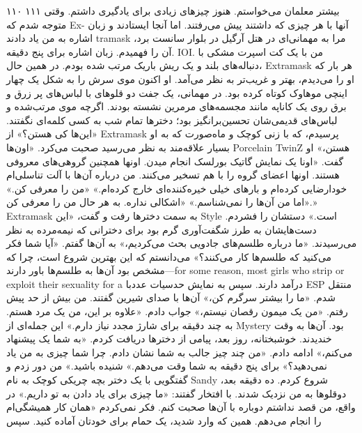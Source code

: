۱۱۰ ۱۱۱  
بیشتر معلمان می‌خواستم. هنوز چیزهای زیادی برای یادگیری داشتم. وقتی متوجه شدم که Ex- آنها با هر چیزی که داشتند پیش می‌رفتند. اما آنجا ایستادند و زبان اشاره به من یاد دادند  
tramask مرا به مهمانی‌ای در هتل آرگیل در بلوار سانست برد، آن را فهمیدم. زبان اشاره برای پنج دقیقه. IOI.  
من با یک کت اسپرت مشکی با دنباله‌های بلند و یک ریش باریک مرتب شده بودم. در همین حال، Extramask هر بار که او را می‌دیدم، بهتر و غریب‌تر به نظر می‌آمد. او اکنون موی سرش را به شکل یک چهار اینچی موهاوک کوتاه کرده بود.  
در مهمانی، یک جفت دو قلوهای با لباس‌های پر زرق و برق روی یک کاناپه مانند مجسمه‌های مرمرین نشسته بودند. اگرچه موی مرتب‌شده و لباس‌های قدیمی‌شان تحسین‌برانگیز بود؛ دخترها تمام شب به کسی کلمه‌ای نگفتند.  
«این‌ها کی هستن؟» از Extramask پرسیدم، که با زنی کوچک و ماه‌صورت که به او بسیار علاقه‌مند به نظر می‌رسید صحبت می‌کرد.  
«اون‌ها Porcelain TwinZ هستن،» او گفت. «اونا یک نمایش گاتیک بورلسک انجام میدن. اونها همچنین گروهی‌های معروفی هستند. اونها اعضای گروه را با هم تسخیر می‌کنند. من درباره آن‌ها با آلت تناسلی‌ام خودارضایی کرده‌ام و بارهای خیلی خیره‌کننده‌ای خارج کرده‌ام.»  
«من را معرفی کن.»  
«اما من آن‌ها را نمی‌شناسم.»  
«اشکالی نداره. به هر حال من را معرفی کن.»  
Extramask به سمت دخترها رفت و گفت، «این Style است.»  
دستشان را فشردم. دست‌هایشان به طرز شگفت‌آوری گرم بود برای دخترانی که نیمه‌مرده به نظر می‌رسیدند. «ما درباره طلسم‌های جادویی بحث می‌کردیم،» به آن‌ها گفتم. «آیا شما فکر می‌کنید که طلسم‌ها کار می‌کنند؟»  
می‌دانستم که این بهترین شروع است، چرا که مشخص بود آن‌ها به طلسم‌ها باور دارند—for some reason, most girls who strip or exploit their sexuality for a  
درآمد دارند. سپس به نمایش حدسیات عددبا ESP منتقل شدم.  
«ما را بیشتر سرگرم کن،» آن‌ها با صدای شیرین گفتند.  
من بیش از حد پیش رفتم. «من یک میمون رقصان نیستم،» جواب دادم. «علاوه بر این، من یک مرد هستم. به چند دقیقه برای شارژ مجدد نیاز دارم.»  
این جمله‌ای از Mystery بود. آن‌ها به وقت خندیدند. خوشبختانه، روز بعد، پیامی از دخترها دریافت کردم.  
«به شما یک پیشنهاد می‌کنم،» ادامه دادم. «من چند چیز جالب به شما نشان دادم. چرا شما چیزی به من یاد نمی‌دهید؟»  
برای پنج دقیقه به شما وقت می‌دهم.»  
شنیده باشید.»  
من دور زدم و گفتگویی با یک دختر بچه چریکی کوچک به نام Sandy شروع کردم. ده دقیقه بعد، دوقلوها به من نزدیک شدند.  
با افتخار گفتند: «ما چیزی برای یاد دادن به تو داریم.»  
در واقع، من قصد نداشتم دوباره با آن‌ها صحبت کنم. فکر نمی‌کردم  
«همان کار همیشگی‌ام را انجام می‌دهم. همین که وارد شدید، یک حمام برای خودتان آماده کنید. سپس